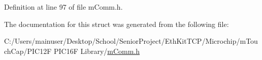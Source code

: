 Definition at line 97 of file m\+Comm.\+h.



The documentation for this struct was generated from the following file\+:\begin{DoxyCompactItemize}
\item 
C\+:/\+Users/mainuser/\+Desktop/\+School/\+Senior\+Project/\+Eth\+Kit\+T\+C\+P/\+Microchip/m\+Touch\+Cap/\+P\+I\+C12\+F P\+I\+C16\+F Library/\hyperlink{m_comm_8h}{m\+Comm.\+h}\end{DoxyCompactItemize}
